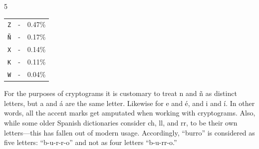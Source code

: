 \documentclass{article}
\numberwithin{figure}{section}
\numberwithin{equation}{section}
\begin{document}
\begin{multicols}{5}
\begin{center}
\begin{tabular}{ccc}
\verb|Z| & - & 0.47\% \\
\verb|Ñ| & - & 0.17\% \\
\verb|X| & - & 0.14\% \\
\verb|K| & - & 0.11\% \\
\verb|W| & - & 0.04\% \\
\end{tabular}
\end{center}
\end{multicols}

{\scriptsize

For the purposes of cryptograms it is customary to treat n and ñ as distinct letters, but a and á are the same letter. Likewise for e and é, and i and í. In other words, all the accent marks get amputated when working with cryptograms. Also, while some older Spanish dictionaries consider ch, ll, and rr, to be their own letters—this has fallen out of modern usage. Accordingly, “burro” is considered as five letters: “b-u-r-r-o” and not as four letters “b-u-rr-o.”}
\end{document}
